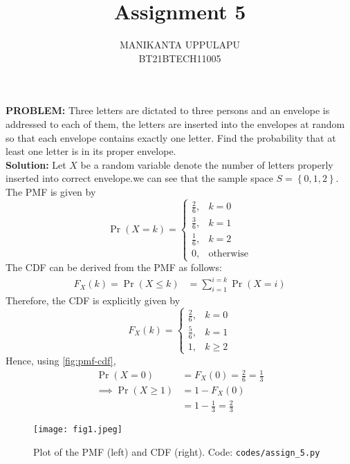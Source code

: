 \documentclass[journal,12pt,twocolumn]{IEEEtran}
\title{Assignment 5}
\author{MANIKANTA UPPULAPU\\BT21BTECH11005}
\date{}
\providecommand{\pr}[1]{\ensuremath{\Pr\left(#1\right)}}
\providecommand{\cdf}[2]{\ensuremath{F_{#1}\left(#2\right)}}
\providecommand{\cbrak}[1]{\ensuremath{\left\{#1\right\}}}
\newcommand{\PROBLEM}{\noindent \textbf{PROBLEM: }}
\newcommand{\solution}{\noindent \textbf{Solution: }}
\begin{document}
\maketitle
\PROBLEM Three letters are dictated to three persons and an envelope is addressed to each of them, the letters are inserted into the envelopes at random so that each envelope contains exactly one letter. Find the probability that at least one letter is in its proper envelope.\\

\solution Let $X$ be a random variable denote the number of letters properly inserted into correct envelope.we can see that the sample space $S = \cbrak{0,1,2}$. \\
The PMF is given by
\begin{equation}
\pr{X = k} = 
\begin{cases}
\frac{2}{6}, & k=0\\
\frac{3}{6}, & k=1\\
\frac{1}{6}, & k=2\\
0, & \text{otherwise} 
\end{cases}
\label{pmf}
\end{equation}
\noindent The CDF can be derived from the PMF as follows:
\begin{align}
\cdf{X}{k} = \pr{X \leq k}  &= \sum_{i = 1}^{i = k}\pr{X = i} 
\label{eqn:cdf}
\end{align}
\noindent Therefore, the CDF is explicitly given by
\begin{equation}
\cdf{X}{k} = 
\begin{cases}
\frac{2}{6}, & k=0\\
\frac{5}{6}, & k=1\\
1, & k \geq 2
\end{cases}
\label{cdf}
\end{equation}
\noindent Hence, using \autoref{fig:pmf-cdf},
\begin{align}
\pr{X=0} &= \cdf{X}{0} = \frac{2}{6} = \frac{1}{3}  \\
\implies \pr{X \geq 1} &= 1 - \cdf{X}{0} \\
&= 1 - \frac{1}{3} = \frac{2}{3} 
\label{sol}
\end{align}

\begin{figure}[!ht]
\centering
\texttt{[image: fig1.jpeg]}
\caption{Plot of the PMF (left) and CDF (right). Code: \texttt{codes/assign{\_}5.py}}
\label{fig:pmf-cdf}
\end{figure}
\end{document}
